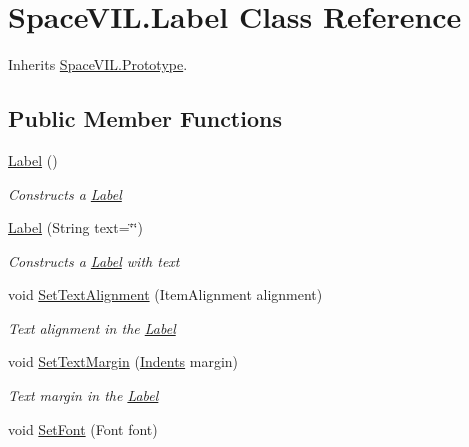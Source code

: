\hypertarget{class_space_v_i_l_1_1_label}{}\section{Space\+V\+I\+L.\+Label Class Reference}
\label{class_space_v_i_l_1_1_label}


Inherits \mbox{\hyperlink{class_space_v_i_l_1_1_prototype}{Space\+V\+I\+L.\+Prototype}}.

\subsection*{Public Member Functions}
\begin{DoxyCompactItemize}
\item 
\mbox{\hyperlink{class_space_v_i_l_1_1_label_aac85dea14968f4b4b68767e9a5138e92}{Label}} ()
\begin{DoxyCompactList}\small\item\em Constructs a \mbox{\hyperlink{class_space_v_i_l_1_1_label}{Label}} \end{DoxyCompactList}\item 
\mbox{\hyperlink{class_space_v_i_l_1_1_label_a6b91b2ddcbc0d66e667d6a15abaa2493}{Label}} (String text=\char`\"{}\char`\"{})
\begin{DoxyCompactList}\small\item\em Constructs a \mbox{\hyperlink{class_space_v_i_l_1_1_label}{Label}} with text \end{DoxyCompactList}\item 
void \mbox{\hyperlink{class_space_v_i_l_1_1_label_a0f5fc3700bd8979d9760bd8ba424db04}{Set\+Text\+Alignment}} (Item\+Alignment alignment)
\begin{DoxyCompactList}\small\item\em Text alignment in the \mbox{\hyperlink{class_space_v_i_l_1_1_label}{Label}} \end{DoxyCompactList}\item 
void \mbox{\hyperlink{class_space_v_i_l_1_1_label_ada348a70497547222a0f5d43d0e8b401}{Set\+Text\+Margin}} (\mbox{\hyperlink{struct_space_v_i_l_1_1_decorations_1_1_indents}{Indents}} margin)
\begin{DoxyCompactList}\small\item\em Text margin in the \mbox{\hyperlink{class_space_v_i_l_1_1_label}{Label}} \end{DoxyCompactList}\item 
void \mbox{\hyperlink{class_space_v_i_l_1_1_label_ae14fde68f34a632420535f72b8f92d86}{Set\+Font}} (Font font)

\end{DoxyCompactItemize}
